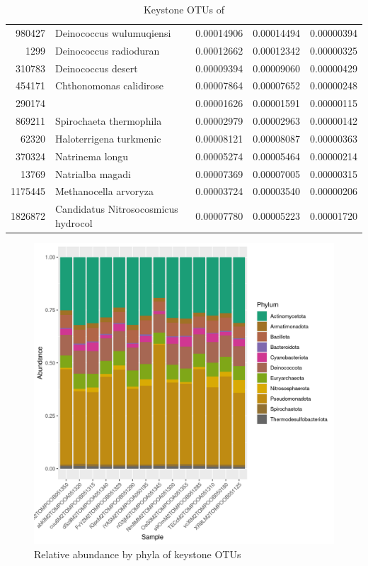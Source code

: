 \begin{table}[ht]
\begin{tabular}{rlrrr}
  980427 & Deinococcus wulumuqiensi & 0.00014906 & 0.00014494 & 0.00000394 \\ 
  1299 & Deinococcus radioduran & 0.00012662 & 0.00012342 & 0.00000325 \\ 
  310783 & Deinococcus desert & 0.00009394 & 0.00009060 & 0.00000429 \\ 
  454171 & Chthonomonas calidirose & 0.00007864 & 0.00007652 & 0.00000248 \\ 
  290174 &   & 0.00001626 & 0.00001591 & 0.00000115 \\ 
  869211 & Spirochaeta thermophila & 0.00002979 & 0.00002963 & 0.00000142 \\ 
  62320 & Haloterrigena turkmenic & 0.00008121 & 0.00008087 & 0.00000363 \\ 
  370324 & Natrinema longu & 0.00005274 & 0.00005464 & 0.00000214 \\ 
  13769 & Natrialba magadi & 0.00007369 & 0.00007005 & 0.00000315 \\ 
  1175445 & Methanocella arvoryza & 0.00003724 & 0.00003540 & 0.00000206 \\ 
  1826872 & Candidatus Nitrosocosmicus hydrocol & 0.00007780 & 0.00005223 & 0.00001720 \\ 
   \hline
\end{tabular}
\caption{Keystone OTUs of } 
\end{table}
\begin{figure}
\centering
\includegraphics[scale = 0.8]{tomate_desarrollo.csv_relative_abundance_Phylum.png}
\caption{Relative abundance by phyla of keystone OTUs }
\label{fig:tomate_desarrollo.csv_phyla}
\end{figure}
